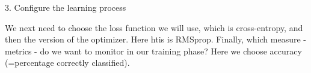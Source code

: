 \documentclass[10pt,ignorenonframetext,]{beamer}
\newenvironment{Shaded}{\begin{snugshade}}{\end{snugshade}}
\newcommand{\DataTypeTok}[1]{\textcolor[rgb]{0.13,0.29,0.53}{#1}}
\newcommand{\KeywordTok}[1]{\textcolor[rgb]{0.13,0.29,0.53}{\textbf{#1}}}
\newcommand{\NormalTok}[1]{#1}
\newcommand{\OperatorTok}[1]{\textcolor[rgb]{0.81,0.36,0.00}{\textbf{#1}}}
\newcommand{\StringTok}[1]{\textcolor[rgb]{0.31,0.60,0.02}{#1}}
\begin{document}
\begin{frame}[fragile]

\begin{block}{3. Configure the learning process}

We next need to choose the loss function we will use, which is
cross-entropy, and then the version of the optimizer. Here htis is
RMSprop. Finally, which measure - metrics - do we want to monitor in our
training phase? Here we choose accuracy (=percentage correctly
classified).

\scriptsize

\begin{Shaded}
\end{Shaded}

\end{block}

\end{frame}
\end{document}
